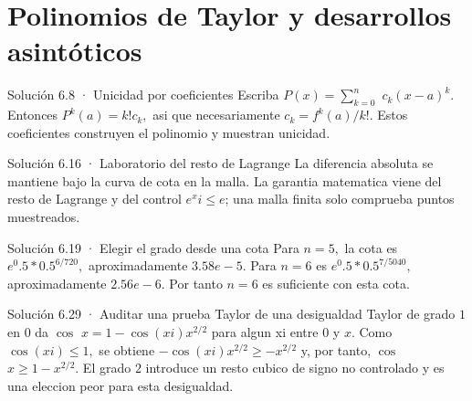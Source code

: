 \documentclass[10pt,a4paper,oneside,openany]{book}
\begin{document}
\chapter{Polinomios de Taylor y desarrollos asintóticos}
\begin{PSevenSolutionFixed}{Solución 6.8 · Unicidad por coeficientes}
Escriba \(P(x)=\sum_{k=0}^n\) \(c_k(x-a)^k\). Entonces \(P^{k}(a)=k!c_k,\) asi que necesariamente \(c_k=f^{k}(a)/k!\). Estos coeficientes construyen el polinomio y muestran unicidad.
\end{PSevenSolutionFixed}
\begin{PSevenSolutionFixed}{Solución 6.16 · Laboratorio del resto de Lagrange}
La diferencia absoluta se mantiene bajo la curva de cota en la malla. La garantia matematica viene del resto de Lagrange y del control \(e^xi\le e\); una malla finita solo comprueba puntos muestreados.
\end{PSevenSolutionFixed}
\begin{PSevenSolutionFixed}{Solución 6.19 · Elegir el grado desde una cota}
Para \(n=5,\) la cota es \(e^{0}.5*0.5^{6/720},\) aproximadamente \(3.58e-5\). Para \(n=6\) es \(e^{0}.5*0.5^{7/5040},\) aproximadamente \(2.56e-6\). Por tanto \(n=6\) es suficiente con esta cota.
\end{PSevenSolutionFixed}
\begin{PSevenSolutionFixed}{Solución 6.29 · Auditar una prueba Taylor de una desigualdad}
Taylor de grado \(1\) en \(0\) da \(\cos\) \(x=1-\cos(xi)x^{2/2}\) para algun xi entre \(0\) y \(x\). Como \(\cos(xi)\le 1,\) se obtiene \(-\cos(xi)x^{2/2}\ge -x^{2/2}\) y, por tanto, \(\cos\) \(x\ge 1-x^{2/2}\). El grado \(2\) introduce un resto cubico de signo no controlado y es una eleccion peor para esta desigualdad.
\end{PSevenSolutionFixed}
\end{document}
